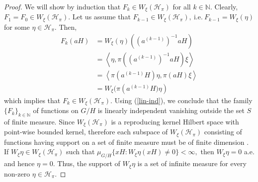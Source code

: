 \documentclass[11pt,reqno]{amsart}
\numberwithin{equation}{section}
\theoremstyle{definition}
\begin{document}
\begin{proof}
We will show by induction  that $F_{k}\in W_{\xi}(\mathcal{H}_{\pi})$ for all $k \in \mathbb{N}.$ Clearly, $F_1 = F_0 \in W_{\xi}(\mathcal{H}_{\pi}).$ Let us  assume that $F_{k-1} \in W_{\xi}(\mathcal{H}_{\pi}),\ \text{i.e.}\  F_{k-1} = W_{\xi}(\eta)$ for some $\eta \in \mathcal{H}_{\pi}.$ Then,
\begin{align*}
F_{k}(aH) &= W_{\xi}(\eta)((a^{(k-1)})^{-1}aH)\\
&=\left\langle \eta , \pi((a^{(k-1)})^{-1}aH)\xi \right\rangle\\
&= \left\langle \pi(a^{(k-1)}H)\eta, \pi(aH)\xi \right\rangle\\
&= W_{\xi}(\pi({a^{(k-1)}H)}\eta)
\end{align*}
which implies that $F_{k} \in W_{\xi}(\mathcal{H}_{\pi}).$ Using (\ref{lin-ind}), we conclude that the family $\{F_{k}\}_{k\in \mathbb{N}}$ of functions on $G/H$ is linearly independent vanishing outside the set $S$ of finite measure.
Since $W_{\xi}(\mathcal{H}_{\pi})$ is a reproducing kernel Hilbert space with point-wise bounded kernel, therefore each subspace of $W_{\xi}(\mathcal{H}_{\pi}) $ consisting of functions having support 
 on a set of finite measure must be of finite dimension \cite{Wilc:00}. If $W_{\xi}\eta \in W_{\xi}(\mathcal{H}_{\pi})$ such that $\mu_{G/H}\{xH : W_{\xi}\eta(xH)\neq 0 \}< \infty, $ then $W_{\xi}\eta = 0$ a.e. and hence $\eta = 0.$
Thus, the support of $W_{\xi}\eta$ is a set of infinite measure for every non-zero $\eta \in \mathcal{H}_{\pi}$.
 \end{proof}
\end{document}
